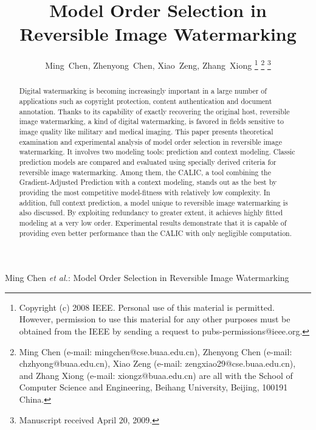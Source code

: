 \documentclass[journal]{IEEEtran}
\begin{document}
\title{Model Order Selection in Reversible Image Watermarking}
\author{Ming~Chen,
        Zhenyong~Chen,
	Xiao~Zeng,
	Zhang~Xiong
\thanks{Copyright (c) 2008 IEEE. Personal use of this material is permitted. However, permission to
use this material for any other purposes must be obtained from the IEEE by sending a request to
pubs-permissions@ieee.org.}%
\thanks{Ming Chen (e-mail: mingchen@cse.buaa.edu.cn), Zhenyong Chen (e-mail: chzhyong@buaa.edu.cn),
Xiao Zeng (e-mail: zengxiao29@cse.buaa.edu.cn), and Zhang Xiong (e-mail: xiongz@buaa.edu.cn) are all
with the School of Computer Science and Engineering, Beihang University, Beijing, 100191 China.}%
\thanks{Manuscript received April 20, 2009.}}


%
{Ming Chen \MakeLowercase{\textit{et al.}}: Model Order Selection in Reversible Image Watermarking}

\maketitle

\begin{abstract}

Digital watermarking is becoming increasingly important in a large number of applications such as
copyright protection, content authentication and document annotation. Thanks to its capability of
exactly recovering the original host, reversible image watermarking, a kind of digital watermarking,
is favored in fields sensitive to image quality like military and medical imaging. This paper
presents theoretical examination and experimental analysis of model order selection in reversible
image watermarking. It involves two modeling tools: prediction and context modeling. Classic
prediction models are compared and evaluated using specially derived criteria for reversible image
watermarking. Among them, the CALIC, a tool combining the Gradient-Adjusted Prediction with a
context modeling, stands out as the best by providing the most competitive model-fitness with
relatively low complexity. In addition, full context prediction, a model unique to reversible image
watermarking is also discussed. By exploiting redundancy to greater extent, it achieves highly
fitted modeling at a very low order. Experimental results demonstrate that it is capable of
providing even better performance than the CALIC with only negligible computation. 

\end{abstract}
\end{document}
